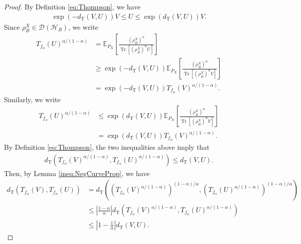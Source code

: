 \documentclass{article}
\begin{document}
\begin{proof}
     By Definition \ref{eq:Thompson}, we have
    \begin{align}
        \exp\left(-d_{\mathrm{T}}\left(V,U\right)\right)V
        \leq U
        \leq \exp\left(d_{\mathrm{T}}\left(V,U\right)\right)V.\nonumber
    \end{align}
    Since $\rho_{B}^{X}\in\mathcal{D}\left(\mathcal{H}_B\right)$, we write
    \begin{align}
        T_{f_{\alpha}}\left(U\right)^{\alpha/(1-\alpha)}
        &=\mathbb{E}_{P_X}\left[\frac{ \left(\rho_B^X\right)^{\alpha}}{\operatorname{Tr}\left[ \left(\rho_B^X\right)^{\alpha}U\right]}\right]\nonumber\\
        &\geq\exp\left(- d_{\mathrm{T}}\left(V,U\right)\right)\mathbb{E}_{P_X}\left[\frac{ \left(\rho_B^X\right)^{\alpha}}{\operatorname{Tr}\left[ \left(\rho_B^X\right)^{\alpha}V\right]}\right]\nonumber\\
        &=\exp\left(-d_{\mathrm{T}}\left(V,U\right)\right)T_{f_{\alpha}}\left(V\right)^{\alpha/(1-\alpha)}.\nonumber
    \end{align}
    Similarly, we write
    \begin{align}
        T_{f_{\alpha}}\left(U\right)^{\alpha/(1-\alpha)}
        &\leq\exp\left(d_{\mathrm{T}}\left(V,U\right)\right)\mathbb{E}_{P_X}\left[\frac{ \left(\rho_B^X\right)^{\alpha}}{\operatorname{Tr}\left[ \left(\rho_B^X\right)^{\alpha}V\right]}\right]\nonumber\\
        &=\exp\left(d_{\mathrm{T}}\left(V,U\right)\right)T_{f_{\alpha}}\left(V\right)^{\alpha/(1-\alpha)}.\nonumber
    \end{align}
    By Definition \ref{eq:Thompson}, the two inequalities above imply that 
    \begin{align}
        d_{\mathrm{T}}\left(T_{f_{\alpha}}\left(V\right)^{\alpha/(1-\alpha)},T_{f_{\alpha}}\left(U\right)^{\alpha/(1-\alpha)}\right) \leq d_{\mathrm{T}} ( V, U ).
    \end{align}
    Then, by Lemma \ref{ineq:NegCurveProp}, we have
    \begin{align}
        d_{\mathrm{T}}\left(T_{f_{\alpha}}\left(V\right),T_{f_{\alpha}}\left(U\right)\right)
        &=d_{\mathrm{T}}\left(\left(T_{f_{\alpha}}\left(V\right)^{\alpha/(1-\alpha)}\right)^{(1-\alpha)/\alpha},\left(T_{f_{\alpha}}\left(U\right)^{\alpha/(1-\alpha)}\right)^{(1-\alpha)/\alpha}\right)\nonumber\\
        &\leq\left|\frac{1-\alpha}{\alpha}\right|d_{\mathrm{T}}\left(T_{f_{\alpha}}\left(V\right)^{\alpha/(1-\alpha)},T_{f_{\alpha}}\left(U\right)^{\alpha/(1-\alpha)}\right)\nonumber\\
        &\leq\left|1-\frac{1}{\alpha}\right|d_{\mathrm{T}}\left(V,U\right).\nonumber
    \end{align}
\end{proof}
\end{document}
